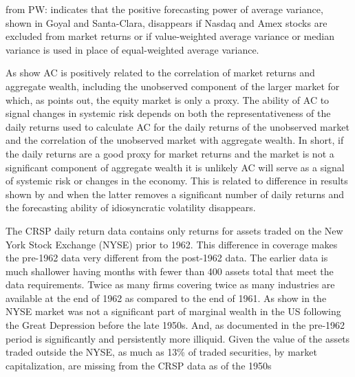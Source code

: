 from PW: indicates that the positive forecasting power of average variance, shown in Goyal and Santa-Clara, disappears if Nasdaq and Amex stocks are excluded from market returns or if value-weighted average variance or median variance is used in place of equal-weighted average variance.

As \citet{pollet_average_2010} show AC is positively related to the correlation of market returns and aggregate wealth, including the unobserved component of the larger market for which, as \citet{roll_critique_1977} points out, the equity market is only a proxy. The ability of AC to signal changes in systemic risk depends on both the representativeness of the daily returns used to calculate AC for the daily returns of the unobserved market and the correlation of the unobserved market with aggregate wealth. In short, if the daily returns are a good proxy for market returns and the market is not a significant component of aggregate wealth it is unlikely AC will serve as a signal of systemic risk or changes in the economy. This is related to difference in results shown by \citet{goyal_idiosyncratic_2003} and \citet{bali_does_nodate} when the latter removes a significant number of daily returns and the forecasting ability of idiosyncratic volatility disappears.

The CRSP daily return data contains only returns for assets traded on the New York Stock Exchange (NYSE) prior to 1962. This difference in coverage makes the pre-1962 data very different from the post-1962 data. The earlier data is much shallower having months with fewer than 400 assets total that meet the data requirements. Twice as many firms covering twice as many industries are available at the end of 1962 as compared to the end of 1961. As show in \citet{taylor_2014} the NYSE market was not a significant part of marginal wealth in the US following the Great Depression before the late 1950s. And, as documented in \citet{jones_century_2002} the pre-1962 period is significantly and persistently more illiquid. Given the value of the assets traded outside the NYSE, as much as 13\% of traded securities, by market capitalization, are missing from the CRSP data as of the 1950s   